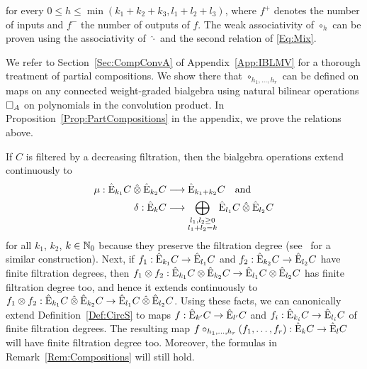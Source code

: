 \documentclass[\MainFolder/Text.tex]{subfiles}
\begin{document}
\begin{Remark}
\begin{RemarkList}
\begin{equation}
\end{equation}
for every $0\le h \le \min(k_1 + k_2 + k_3, l_1 + l_2 + l_3)$, where $f^+$ denotes the number of inputs and $f^-$ the number of outputs of $f$. The weak associativity of $\circ_h$ can be proven using the associativity of $\,\hat{\cdot}$ and the second relation of \eqref{Eq:Mix}.
\item We refer to Section~\ref{Sec:CompConvA} of Appendix~\ref{App:IBLMV} for a thorough treatment of partial compositions. We show there that $\circ_{h_1,\dotsc,h_r}$ can be defined on maps on any connected weight-graded bialgebra using natural bilinear operations $\SquareComp_A$ on polynomials in the convolution product. In Proposition~\ref{Prop:PartCompositions} in the appendix, we prove the relations above.\qedhere
\end{RemarkList}
\end{Remark}

If $C$ is filtered by a decreasing filtration, then the bialgebra operations extend continuously to 
\begin{align*}
\Prod: \hat{\Ext}_{k_1} C \COtimes \hat{\Ext}_{k_2} C &\longrightarrow \hat{\Ext}_{k_1+k_2} C \quad \text{and}\\ 
\CoProd: \hat{\Ext}_k C &\longrightarrow \bigoplus_{\substack{l_1, l_2 \ge 0 \\ l_1 + l_2 = k}} \hat{\Ext}_{l_1}C\COtimes\hat{\Ext}_{l_2}C
\end{align*}
for all $k_1$, $k_2$, $k\in \mathbb{N}_0$ because they preserve the filtration degree (see~\cite{Fresse} for a similar construction). Next, if $f_1: \hat{\mathrm{E}}_{k_1}C \rightarrow \hat{\mathrm{E}}_{l_1}C$ and $f_2: \hat{\mathrm{E}}_{k_2}C\rightarrow \hat{\mathrm{E}}_{l_2}C$ have finite filtration degrees, then $f_1 \otimes f_2: \hat{\mathrm{E}}_{k_1} C \otimes \hat{\mathrm{E}}_{k_2} C \rightarrow \hat{\mathrm{E}}_{l_1}C\otimes\hat{\mathrm{E}}_{l_2}C$ has finite filtration degree too, and hence it extends continuously to $f_1 \otimes f_2: \hat{\Ext}_{k_1} C\COtimes \hat{\Ext}_{k_2} C \rightarrow \hat{\Ext}_{l_1}C\COtimes\hat{\Ext}_{l_2}C$.
Using these facts, we can canonically extend Definition~\ref{Def:CircS} to maps $f: \hat{\mathrm{E}}_{k'} C \rightarrow \hat{\mathrm{E}}_{l'} C$ and $f_i: \hat{\mathrm{E}}_{k_i}C \rightarrow \hat{\mathrm{E}}_{l_i}C$ of finite filtration degrees. The resulting map $f\circ_{h_1,\dotsc,h_r}(f_1,\dotsc,f_r): \hat{\mathrm{E}}_k C \rightarrow \hat{\mathrm{E}}_l C$ will have finite filtration degree too. Moreover, the formulas in Remark~\ref{Rem:Compositions} will still hold.%
\end{document}
